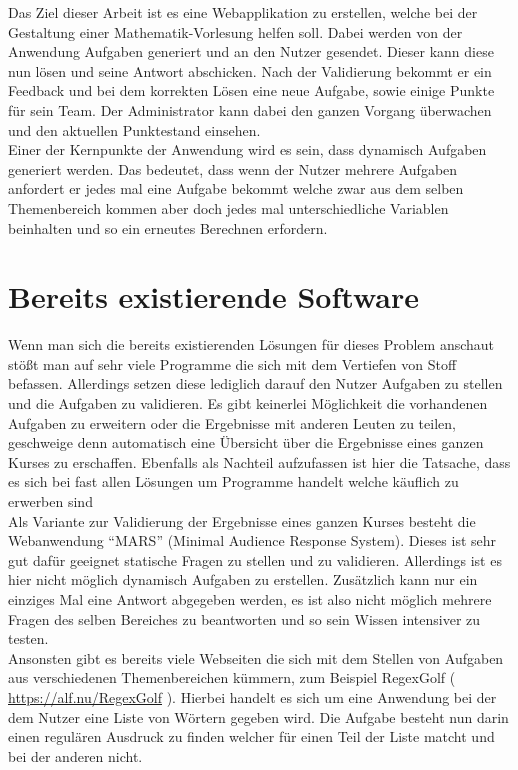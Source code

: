 Das Ziel dieser Arbeit ist es eine Webapplikation zu erstellen, welche bei der Gestaltung einer Mathematik-Vorlesung helfen soll. Dabei werden von der Anwendung Aufgaben generiert und an den Nutzer gesendet. Dieser kann diese nun lösen und seine Antwort abschicken. Nach der Validierung bekommt er ein Feedback und bei dem korrekten Lösen eine neue Aufgabe, sowie einige Punkte für sein Team. Der Administrator kann dabei den ganzen Vorgang überwachen und den aktuellen Punktestand einsehen. \\
Einer der Kernpunkte der Anwendung wird es sein, dass dynamisch Aufgaben generiert werden. Das bedeutet, dass wenn der Nutzer mehrere Aufgaben anfordert er jedes mal eine Aufgabe bekommt welche zwar aus dem selben Themenbereich kommen aber doch jedes mal unterschiedliche Variablen beinhalten und so ein erneutes Berechnen erfordern.


\section{Bereits existierende Software}

Wenn man sich die bereits existierenden Lösungen für dieses Problem anschaut stößt man auf sehr viele Programme die sich mit dem Vertiefen von Stoff befassen. Allerdings setzen diese lediglich darauf den Nutzer Aufgaben zu stellen und die Aufgaben zu validieren. Es gibt keinerlei Möglichkeit die vorhandenen Aufgaben zu erweitern oder die Ergebnisse mit anderen Leuten zu teilen, geschweige denn automatisch eine Übersicht über die Ergebnisse eines ganzen Kurses zu erschaffen. Ebenfalls als Nachteil aufzufassen ist hier die Tatsache, dass es sich bei fast allen Lösungen um Programme handelt welche käuflich zu erwerben sind\\

Als Variante zur Validierung der Ergebnisse eines ganzen Kurses besteht die Webanwendung ``MARS'' (Minimal Audience Response System). Dieses ist sehr gut dafür geeignet statische Fragen zu stellen und zu validieren. Allerdings ist es hier nicht möglich dynamisch Aufgaben zu erstellen. Zusätzlich kann nur ein einziges Mal eine Antwort abgegeben werden, es ist also nicht möglich mehrere Fragen des selben Bereiches zu beantworten und so sein Wissen intensiver zu testen. \\

Ansonsten gibt es bereits viele Webseiten die sich mit dem Stellen von Aufgaben aus verschiedenen Themenbereichen kümmern, zum Beispiel RegexGolf ( \url{https://alf.nu/RegexGolf} ). Hierbei handelt es sich um eine Anwendung bei der dem Nutzer eine Liste von Wörtern gegeben wird. Die Aufgabe besteht nun darin einen regulären Ausdruck zu finden welcher für einen Teil der Liste matcht und bei der anderen nicht. \\

